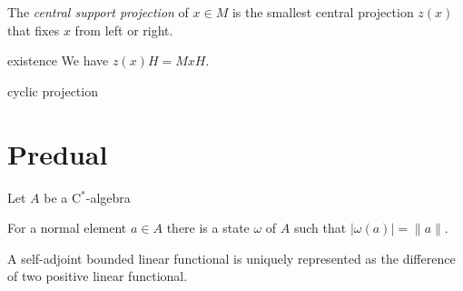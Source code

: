 \documentclass{../../large}
\begin{document}
\begin{prb}[]
The \emph{central support projection} of $x\in M$ is the smallest central projection $z(x)$ that fixes $x$ from left or right.

existence
We have $z(x)H=MxH$.


cyclic projection

\end{prb}




\section{Predual}


\begin{prb}
Let $A$ be a C$^*$-algebra
\begin{parts}
\item For a normal element $a\in A$ there is a state $\omega$ of $A$ such that $|\omega(a)|=\|a\|$.
\item A self-adjoint bounded linear functional is uniquely represented as the difference of two positive linear functional.




\end{parts}
\end{prb}
\end{document}

